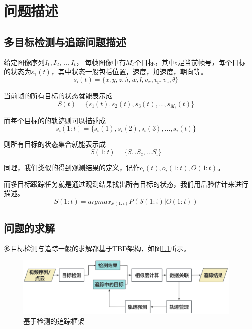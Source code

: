 \chapter{问题描述}
\section{多目标检测与追踪问题描述}

给定图像序列${I_1, I_2,..., I_t}$， 每帧图像中有$M_t$个目标，其中t是当前帧号，每个目标的状态为$ s_1(t) $，其中状态一般包括位置，速度，加速度，朝向等。
\begin{equation}
	s_i(t) = \{ x,y,z,h,w,l,v_x,v_y,v_z,\theta \}
\end{equation}

当前帧的所有目标的状态就能表示成
\begin{equation}
	S(t) = \{ s_1(t), s_2(t),s_3(t),...,s_{M_t}(t) \}
\end{equation}

而每个目标的的轨迹则可以描述成
\begin{equation}
	s_i(1:t) = \{ s_i(1),s_i(2),s_i(3),...,s_i(t) \}
\end{equation}

则所有目标的状态集合就能表示成
\begin{equation}
	S(1:t) = \{ S_1. S_2,...S_t \}
\end{equation}

同理，我们类似的得到观测结果的定义，记作$ o_i(t),o_i(1:t),O(1:t) $。

而多目标跟踪任务就是通过观测结果找出所有目标的状态，我们用后验估计来进行描述。
\begin{equation}
	S(1:t) = argmax_{S(1:t)}P(S(1:t)|O(1:t))
\end{equation}

\section{问题的求解}
多目标检测与追踪一般的求解都基于TBD架构，如图\ref{dbt}所示。
\begin{figure}[H]
	\centering
	\includegraphics[width=\textwidth]{images/DBT.png}
	\caption{基于检测的追踪框架}
	\label{dbt}
\end{figure}


